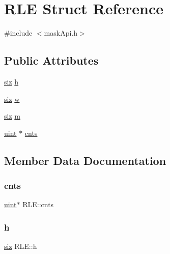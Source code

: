 \hypertarget{struct_r_l_e}{}\section{R\+LE Struct Reference}
\label{struct_r_l_e}


{\ttfamily \#include $<$mask\+Api.\+h$>$}

\subsection*{Public Attributes}
\begin{DoxyCompactItemize}
\item 
\hyperlink{mask_api_8h_aa6f8bea7f64712768a7b9a4acc9601bf}{siz} \hyperlink{struct_r_l_e_a0729872eb55bbc6269cc535d91b97db1}{h}
\item 
\hyperlink{mask_api_8h_aa6f8bea7f64712768a7b9a4acc9601bf}{siz} \hyperlink{struct_r_l_e_ad5eb7382229117c8f368a2482711f540}{w}
\item 
\hyperlink{mask_api_8h_aa6f8bea7f64712768a7b9a4acc9601bf}{siz} \hyperlink{struct_r_l_e_afc79c7bf9f98a42ca3c9f831042b9eee}{m}
\item 
\hyperlink{mask_api_8h_a91ad9478d81a7aaf2593e8d9c3d06a14}{uint} $\ast$ \hyperlink{struct_r_l_e_a2abdba115f54bd3d2de7115e4d8fa0a1}{cnts}
\end{DoxyCompactItemize}


\subsection{Member Data Documentation}
\mbox{\label{struct_r_l_e_a2abdba115f54bd3d2de7115e4d8fa0a1}} 
\subsubsection{\texorpdfstring{cnts}{cnts}}
{\footnotesize\ttfamily \hyperlink{mask_api_8h_a91ad9478d81a7aaf2593e8d9c3d06a14}{uint}$\ast$ R\+L\+E\+::cnts}

\mbox{\label{struct_r_l_e_a0729872eb55bbc6269cc535d91b97db1}} 
\subsubsection{\texorpdfstring{h}{h}}
{\footnotesize\ttfamily \hyperlink{mask_api_8h_aa6f8bea7f64712768a7b9a4acc9601bf}{siz} R\+L\+E\+::h}

